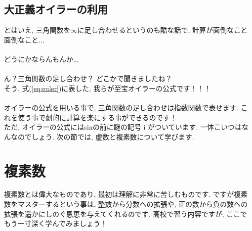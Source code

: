 \documentclass[11pt,a4paper]{jreport}
\begin{document}
\subsection{大正義オイラーの利用}
とはいえ, 三角関数を$∞$に足し合わせるというのも酷な話で, 計算が面倒なこと面倒なこと...\\
\\
どうにかならんもんか...\\
\\
ん？三角関数の足し合わせ？ どこかで聞きましたね？\\
そう, 式(\ref{eq:euler})に表した, 我らが至宝オイラーの公式です！！！\\
\\
オイラーの公式を用いる事で, 三角関数の足し合わせは指数関数で表せます. これを使う事で劇的に計算を楽にする事ができるのです！\\
ただ, オイラーの公式にはsinの前に謎の記号 i がついています. 一体こいつはなんなのでしょう. 次の節では, 虚数と複素数について学びます.\\

\section{複素数}
複素数とは偉大なものであり, 最初は理解に非常に苦しむものです. ですが複素数をマスターするという事は, 整数から分数への拡張や, 正の数から負の数への拡張を遥かにしのぐ恩恵を与えてくれるのです. 高校で習う内容ですが, ここでもう一寸深く学んでみましょう！\\
\end{document}
